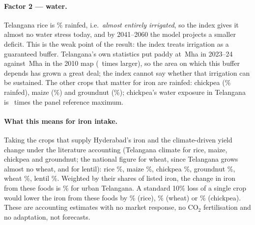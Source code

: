\paragraph{Factor 2 --- water.} Telangana rice is \tgRiceRainfed\% rainfed, i.e.\ \emph{almost entirely
irrigated}, so the index gives it almost no water stress today, and by 2041--2060 the model projects a smaller
deficit. This is the weak point of the result: the index treats irrigation as a guaranteed buffer. Telangana's
own statistics put paddy at \tgPaddyAreaMha\,Mha in 2023--24 against \tgPaddySpamMha\,Mha in the 2010 map
(\tgPaddyGrowth\ times larger), so the area on which this buffer depends has grown a great deal; the index
cannot say whether that irrigation can be sustained. The other crops that matter for iron are rainfed:
chickpea (\tgChickpeaRainfed\% rainfed), maize (\tgMaizeRainfed\%) and groundnut (\tgGroundnutRainfed\%); chickpea's
water exposure in Telangana is \tgChickpeaEwaterTwoZeroZeroOneTwoZeroTwoFour\ times the panel reference maximum.

\paragraph{What this means for iron intake.} Taking the crops that supply Hyderabad's iron and the climate-driven
yield change under the literature accounting (Telangana climate for rice, maize, chickpea and groundnut; the
national figure for wheat, since Telangana grows almost no wheat, and for lentil): rice \hqdYRice\%, maize
\hqdYMaize\%, chickpea \hqdYChickpea\%, groundnut \hqdYGroundnut\%, wheat \hqdYWheat\%, lentil \hqdYLentil\%. Weighted
by their shares of listed iron, the change in iron from these foods is \hqIronChangeUrban\% for urban Telangana.
A standard 10\% loss of a single crop would lower the iron from these foods by \hqIronTenRiceUrban\% (rice),
\hqIronTenWheatUrban\% (wheat) or \hqIronTenChickpeaUrban\% (chickpea). These are accounting estimates with no market
response, no CO$_2$ fertilisation and no adaptation, not forecasts.

